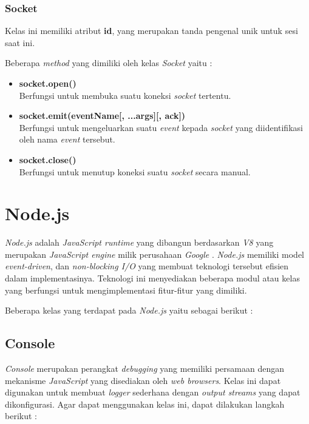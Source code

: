 \subsubsection{Socket}
Kelas ini memiliki atribut \textbf{id}, yang merupakan tanda pengenal unik untuk sesi saat ini.

Beberapa \textit{method} yang dimiliki oleh kelas \textit{Socket} yaitu : 

\begin{itemize}
	\item \textbf{socket.open()} \\ Berfungsi untuk membuka suatu koneksi \textit{socket} tertentu.
	\item \textbf{socket.emit(eventName[, ...args][, ack])} \\ Berfungsi untuk mengeluarkan suatu \textit{event} kepada \textit{socket} yang diidentifikasi oleh nama \textit{event} tersebut.
	\item \textbf{socket.close()} \\ Berfungsi untuk menutup koneksi suatu \textit{socket} secara manual. 
\end{itemize}


\section{Node.js}
\label{sec:Node.js}

\textit{Node.js} adalah \textit{JavaScript runtime} yang dibangun berdasarkan \textit{V8} yang merupakan \textit{JavaScript engine} milik perusahaan \textit{Google} \cite{Nodejs}. \textit{Node.js} memiliki model \textit{event-driven}, dan \textit{non-blocking I/O} yang membuat teknologi tersebut efisien dalam implementasinya. Teknologi ini menyediakan beberapa modul atau kelas yang berfungsi untuk mengimplementasi fitur-fitur yang dimiliki.

Beberapa kelas yang terdapat pada \textit{Node.js} yaitu sebagai berikut : 

\subsection{Console}
\textit{Console} merupakan perangkat \textit{debugging} yang memiliki persamaan dengan mekanisme \textit{JavaScript} yang disediakan oleh \textit{web browsers}. Kelas ini dapat digunakan untuk membuat \textit{logger} sederhana dengan \textit{output streams} yang dapat dikonfigurasi. Agar dapat menggunakan kelas ini, dapat dilakukan langkah berikut : 

